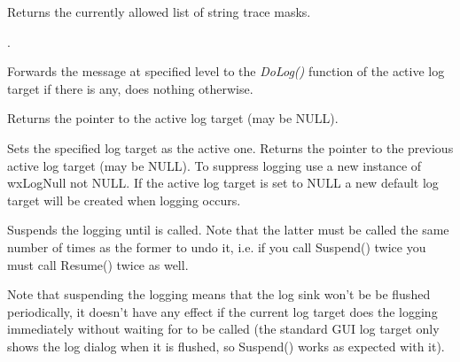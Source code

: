 
\label{wxloggettracemasks}


Returns the currently allowed list of string trace masks.


.

\label{wxlogonlog}


Forwards the message at specified level to the {\it DoLog()} function of the
active log target if there is any, does nothing otherwise.

\label{wxloggetactivetarget}


Returns the pointer to the active log target (may be NULL).

\label{wxlogsetactivetarget}


Sets the specified log target as the active one. Returns the pointer to the
previous active log target (may be NULL).  To suppress logging use a new
instance of wxLogNull not NULL.  If the active log target is set to NULL a
new default log target will be created when logging occurs.

\label{wxlogsuspend}


Suspends the logging until  is called. Note that
the latter must be called the same number of times as the former to undo it,
i.e. if you call Suspend() twice you must call Resume() twice as well.

Note that suspending the logging means that the log sink won't be be flushed
periodically, it doesn't have any effect if the current log target does the
logging immediately without waiting for  to be
called (the standard GUI log target only shows the log dialog when it is
flushed, so Suspend() works as expected with it).

